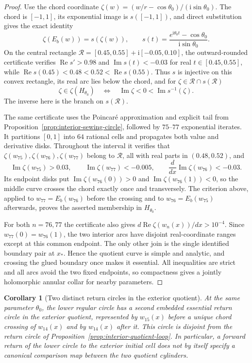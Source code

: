 \documentclass[11pt]{amsart}
\newtheorem{corollary}[theorem]{Corollary}
\theoremstyle{definition}
\newcommand{\ii}{\mathrm{i}}
\begin{document}
\begin{proof}
Use the chord coordinate
$\zeta(w)=(w/r-\cos\theta_0)/(\ii\sin\theta_0)$.
The chord is $[-1,1]$, its exponential image is
$s([-1,1])$, and direct substitution gives the exact identity
\[
 \zeta(E_b(w))=s(\zeta(w)),\qquad
 s(t)=\frac{e^{\ii\theta_0t}-\cos\theta_0}
              {\ii\sin\theta_0}.
\]
On the central rectangle
$\mathcal R=[0.45,0.55]+\ii[-0.05,0.10]$, the outward-rounded
certificate verifies
$\operatorname{Re}s'>0.98$ and
$\operatorname{Im}s(t)<-0.03$ for real
$t\in[0.45,0.55]$, while
$\operatorname{Re}s(0.45)<0.48<0.52<\operatorname{Re}s(0.55)$.
Thus $s$ is injective on this convex rectangle,
its real arc lies below the chord, and for
$\zeta\in\mathcal R\cap s(\mathcal R)$
\[
 \zeta\in\zeta(H_{\theta_0})
 \quad\Longleftrightarrow\quad
 \operatorname{Im}\zeta<0<\operatorname{Im}s^{-1}(\zeta).
\]
The inverse here is the branch on $s(\mathcal R)$.

The same certificate uses the Poincar\'e approximation and explicit
tail from Proposition~\ref{prop:interior-sewing-circle}, followed by
$75$--$77$ exponential iterates.  It partitions $[0,1]$ into $64$
rational cells and propagates both value and derivative disks.
Throughout the interval it verifies that
$\zeta(w_{75}),\zeta(w_{76}),\zeta(w_{77})$ belong to
$\mathcal R$, all with real parts in $(0.48,0.52)$, and
\[
 \operatorname{Im}\zeta(w_{75})>0.03,
 \qquad \operatorname{Im}\zeta(w_{77})<-0.005,
 \qquad \frac{d}{dx}\operatorname{Im}\zeta(w_{76})<-0.03.
\]
Its endpoint disks put
$\operatorname{Im}\zeta(w_{76}(0))>0$ and
$\operatorname{Im}\zeta(w_{76}(1))<0$, so the middle curve crosses
the chord exactly once and transversely.  The criterion above,
applied to $w_{77}=E_b(w_{76})$ before the crossing and to
$w_{76}=E_b(w_{75})$ afterwards, proves the asserted membership
in $H_{\theta_0}$.

For both $n=76,77$ the certificate also gives
$d\operatorname{Re}\zeta(w_n(x))/dx>10^{-4}$.
Since $w_{77}(0)=w_{76}(1)$, the two interior arcs have disjoint
real-coordinate ranges except at this common endpoint.  The only
other join is the single identified boundary pair at $x_*$.
Hence the quotient curve is simple and analytic, and crossing the
glued boundary once makes it essential.  All inequalities are
strict and all arcs avoid the two fixed endpoints, so compactness
gives a jointly holomorphic annular collar for nearby parameters.
\end{proof}

\begin{corollary}[Two distinct return circles in the exterior quotient]
\label{cor:interior-two-returns}
At the same parameter $\theta_0$, the lower regular circle has a second
embedded essential return circle in the exterior quotient, represented
by $w_{15}(x)$ before a unique chord crossing of $w_{14}(x)$ and by
$w_{14}(x)$ after it.  This circle is disjoint from the return circle
of Proposition~\ref{prop:interior-quotient-loop}.  In particular, a
forward return of the lower circle to the exterior initial cell does
not by itself specify a canonical comparison map between the two
quotient cylinders.
\end{corollary}
\end{document}

